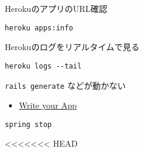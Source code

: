 \documentclass[t, aspectratio=169]{beamer}
\begin{document}
\begin{frame}[fragile,label=sec-11-0-2]{HerokuのアプリのURL確認}
 \begin{verbatim}
heroku apps:info
\end{verbatim}
\end{frame}
\begin{frame}[fragile,label=sec-11-0-3]{Herokuのログをリアルタイムで見る}
 \begin{verbatim}
heroku logs --tail
\end{verbatim}
\end{frame}
\begin{frame}[fragile,label=sec-11-0-4]{\texttt{rails generate} などが動かない}
 \begin{itemize}
\item \href{https://devcenter.heroku.com/articles/getting-started-with-rails4#write-your-app}{Write your App}
\end{itemize}

\begin{verbatim}
spring stop
\end{verbatim}
\end{frame}
<<<<<<< HEAD
\end{document}

